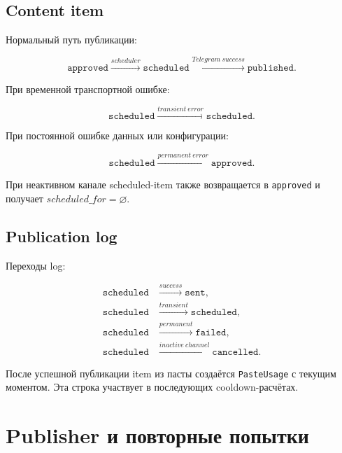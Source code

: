 \documentclass[12pt,a4paper]{article}
\newcommand{\Empty}{\varnothing}
\newcommand{\Status}[1]{\texttt{#1}}
\begin{document}
\subsection{Content item}

Нормальный путь публикации:

\begin{equation}
  \Status{approved}
  \xrightarrow{scheduler}
  \Status{scheduled}
  \xrightarrow{Telegram\ success}
  \Status{published}.
  \label{eq:item-state-success}
\end{equation}

При временной транспортной ошибке:

\begin{equation}
  \Status{scheduled}
  \xrightarrow{transient\ error}
  \Status{scheduled}.
  \label{eq:item-state-transient}
\end{equation}

При постоянной ошибке данных или конфигурации:

\begin{equation}
  \Status{scheduled}
  \xrightarrow{permanent\ error}
  \Status{approved}.
  \label{eq:item-state-permanent}
\end{equation}

При неактивном канале scheduled-item также возвращается в \Status{approved} и
получает $scheduled\_for=\Empty$.

\subsection{Publication log}

Переходы log:

\begin{align}
  \Status{scheduled}&\xrightarrow{success}\Status{sent},\\
  \Status{scheduled}&\xrightarrow{transient}\Status{scheduled},\\
  \Status{scheduled}&\xrightarrow{permanent}\Status{failed},\\
  \Status{scheduled}&\xrightarrow{inactive\ channel}\Status{cancelled}.
\end{align}

После успешной публикации item из пасты создаётся \texttt{PasteUsage} с текущим
моментом. Эта строка участвует в последующих cooldown-расчётах.

\section{Publisher и повторные попытки}
\end{document}
